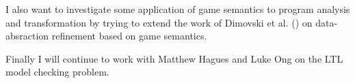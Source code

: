 I also want to investigate some application of game semantics to
program analysis and transformation by trying to extend the work of
Dimovski et al. (\cite{DBLP:conf/sas/DimovskiGL05}) on
data-absraction refinement based on game semantics.

Finally I will continue to work with Matthew Hagues and Luke Ong on
the LTL model checking problem.
